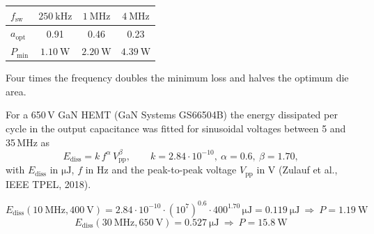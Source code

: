 
\begin{solutionblock}
	\begin{solutiontable}[ht]
		\centering
		\begin{tabular}{lccc}
			\toprule
			$f_\mathrm{sw}$     & $\SI{250}{\kilo\hertz}$ & $\SI{1}{\mega\hertz}$ & $\SI{4}{\mega\hertz}$ \\
			\midrule
			$a_\mathrm{opt}$    & 0.91                    & 0.46                  & 0.23                  \\
			$P_\mathrm{min}$    & $\SI{1.10}{\watt}$      & $\SI{2.20}{\watt}$    & $\SI{4.39}{\watt}$    \\
			\bottomrule
		\end{tabular}
		\caption{Optimum die size and minimum loss.}
		\label{stable:ex02_die}
	\end{solutiontable}
	Four times the frequency doubles the minimum loss and halves the optimum die area.
\end{solutionblock}



For a 650\,V GaN HEMT (GaN Systems GS66504B) the energy dissipated per cycle in the output capacitance was fitted for sinusoidal voltages between 5 and 35\,MHz as
\begin{equation*}
	E_\mathrm{diss} = k\,f^{\alpha}\,V_\mathrm{pp}^{\beta},\qquad k=2.84\cdot10^{-10},\ \alpha=0.6,\ \beta=1.70,
\end{equation*}
with $E_\mathrm{diss}$ in $\si{\micro\joule}$, $f$ in Hz and the peak-to-peak voltage $V_\mathrm{pp}$ in V (Zulauf et al., IEEE TPEL, 2018).


\begin{solutionblock}
	\begin{equation}
		E_\mathrm{diss}(\SI{10}{\mega\hertz},\SI{400}{\volt}) = 2.84\cdot10^{-10}\cdot(10^7)^{0.6}\cdot400^{1.70}\,\si{\micro\joule} = \SI{0.119}{\micro\joule}\ \Rightarrow\ P=\SI{1.19}{\watt}
	\end{equation}
	\begin{equation}
		E_\mathrm{diss}(\SI{30}{\mega\hertz},\SI{650}{\volt}) = \SI{0.527}{\micro\joule}\ \Rightarrow\ P=\SI{15.8}{\watt}
	\end{equation}
\end{solutionblock}

